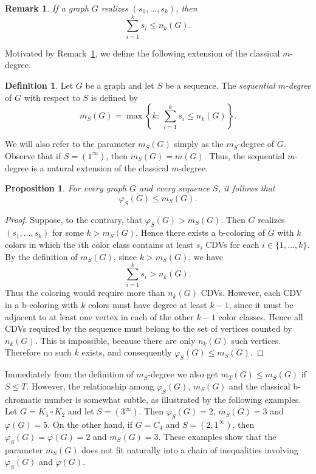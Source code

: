\documentclass{article}
\newcommand{\cp}{\, \square \,}
\newtheorem{proposition}[theorem]{Proposition}
\newtheorem{remark}[theorem]{Remark}
\theoremstyle{definition}
\newtheorem{definition}[theorem]{Definition}
\begin{document}
\begin{remark}
\label{r:ms}
If a graph $G$ realizes $(s_1,\ldots,s_k)$, then
$$\sum_{i=1}^{k}s_i\leq n_k(G).$$
\end{remark}

Motivated by Remark~\ref{r:ms}, we define the following extension of the classical $m$-degree.

\begin{definition}
Let $G$ be a graph and let $S$ be a sequence. The {\em sequential $m$-degree} of $G$ with respect to $S$ is defined by
$$m_S(G)=\max\left\{k :\ \sum_{i=1}^{k}s_i\leq n_k(G)\right\}.$$
\end{definition}

We will also refer to the parameter $m_S(G)$ simply as the $m_S$-degree of $G$. Observe that if $S=(1^\infty)$, then $m_S(G)=m(G)$. Thus, the sequential $m$-degree is a natural extension of the classical $m$-degree.

\begin{proposition}
For every graph $G$ and every sequence $S$, it follows that 
$$\varphi_S(G)\leq m_S(G).$$
\end{proposition}

\begin{proof}
Suppose, to the contrary, that $\varphi_S(G)>m_S(G)$. Then $G$ realizes $(s_1,\ldots,s_k)$ for some $k>m_S(G)$. Hence there exists a b-coloring of $G$ with $k$ colors in which the $i$th color class contains at least $s_i$ CDVs for each $i\in\{1,\ldots,k\}$. By the definition of $m_S(G)$, since $k>m_S(G)$, we have
$$\sum_{i=1}^{k}s_i>n_k(G).$$
Thus the coloring would require more than $n_k(G)$ CDVs. However, each CDV in a b-coloring with $k$ colors must have degree at least $k-1$, since it must be adjacent to at least one vertex in each of the other $k-1$ color classes. Hence all CDVs required by the sequence must belong to the set of vertices counted by $n_k(G)$. This is impossible, because there are only $n_k(G)$ such vertices.
Therefore no such $k$ exists, and consequently $\varphi_S(G)\leq m_S(G)$.
\end{proof}

\medskip

Immediately from the definition of $m_S$-degree we also get $m_T(G)\leq m_S(G)$ if $S\leq T$. However, the relationship among $\varphi_S(G)$, $m_S(G)$ and the classical b-chromatic number is somewhat subtle, as illustrated by the following examples. Let $G=K_5\cp K_2$ and let $S=(3^\infty)$. Then $\varphi_S(G)=2$, $m_S(G)=3$ and $\varphi(G)=5$. On the other hand, if $G=C_4$ and $S=(2,1^\infty)$, then $\varphi_S(G)=\varphi(G)=2$ and $m_S(G)=3$. These examples show that the parameter $m_S(G)$ does not fit naturally into a chain of inequalities involving $\varphi_S(G)$ and $\varphi(G)$.
\end{document}
